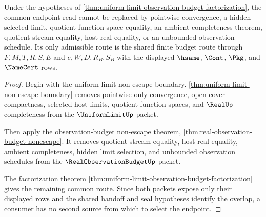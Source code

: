 \begin{theorem}
\label{thm:uniform-limit-observation-budget-nonchoice}
Under the hypotheses of \autoref{thm:uniform-limit-observation-budget-factorization}, the common endpoint read cannot be replaced by pointwise convergence, a hidden selected limit, quotient function-space equality, an ambient completeness theorem, quotient stream equality, host real equality, or an unbounded observation schedule. Its only admissible route is the shared finite budget route through $F,M,T,R,S,E$ and $e,W,D,R_B,S_B$ with the displayed $\hsame$, $\Cont$, $\Pkg$, and $\NameCert$ rows.
\end{theorem}
\begin{proof}
Begin with the uniform-limit non-escape boundary. \autoref{thm:uniform-limit-non-escape-boundary} removes pointwise-only convergence, open-cover compactness, selected host limits, quotient function spaces, and $\RealUp$ completeness from the $\UniformLimitUp$ packet.

Then apply the observation-budget non-escape theorem, \autoref{thm:real-observation-budget-nonescape}. It removes quotient stream equality, host real equality, ambient completeness, hidden limit selection, and unbounded observation schedules from the $\RealObservationBudgetUp$ packet.

The factorization theorem \autoref{thm:uniform-limit-observation-budget-factorization} gives the remaining common route. Since both packets expose only their displayed rows and the shared handoff and seal hypotheses identify the overlap, a consumer has no second source from which to select the endpoint.
\end{proof}

